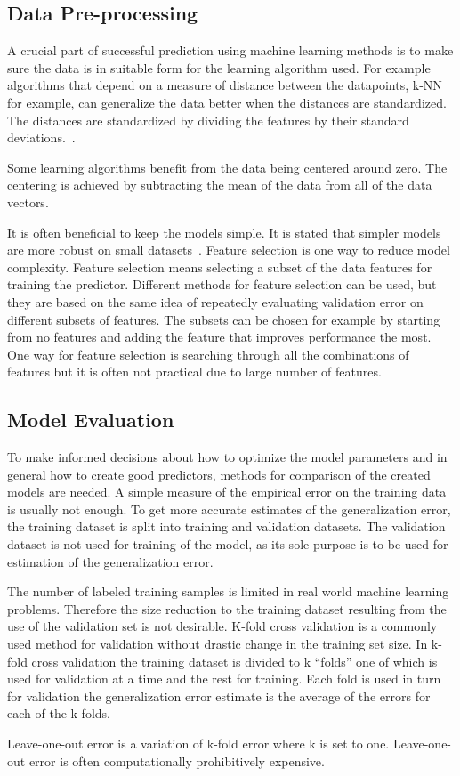 \subsection{Data Pre-processing}
A crucial part of successful prediction using machine learning methods is to make sure the data is in suitable form for the learning algorithm used. For example algorithms that depend on a measure of distance between the datapoints, k-NN for example, can generalize the data better when the distances are standardized. The distances are standardized by dividing the features by their standard deviations.~\cite{alpaydin:2004:introduction}.

Some learning algorithms benefit from the data being centered around zero. The centering is achieved by subtracting the mean of the data from all of the data vectors.~\cite{alpaydin:2004:introduction}

It is often beneficial to keep the models simple. It is stated that simpler models are more robust on small datasets~\cite{alpaydin:2004:introduction}. Feature selection is one way to reduce model complexity. Feature selection means selecting a subset of the data features for training the predictor. Different methods for feature selection can be used, but they are based on the same idea of repeatedly evaluating validation error on different subsets of features. The subsets can be chosen for example by starting from no features and adding the feature that improves performance the most. One way for feature selection is searching through all the combinations of features but it is often not practical due to large number of features.~\cite{alpaydin:2004:introduction}

\subsection{Model Evaluation}
To make informed decisions about how to optimize the model parameters and in general how to create good predictors, methods for comparison of the created models are needed. A simple measure of the empirical error on the training data is usually not enough. To get more accurate estimates of the generalization error, the training dataset is split into training and validation datasets. The validation dataset is not used for training of the model, as its sole purpose is to be used for estimation of the generalization error.~\cite{alpaydin:2004:introduction}

The number of labeled training samples is limited in real world machine learning problems. Therefore the size reduction to the training dataset resulting from the use of the validation set is not desirable. K-fold cross validation is a commonly used method for validation without drastic change in the training set size. In k-fold cross validation the training dataset is divided to k ``folds'' one of which is used for validation at a time and the rest for training. Each fold is used in turn for validation the generalization error estimate is the average of the errors for each of the k-folds.~\cite{alpaydin:2004:introduction}

Leave-one-out error is a variation of k-fold error where k is set to one. Leave-one-out error is often computationally prohibitively expensive.

